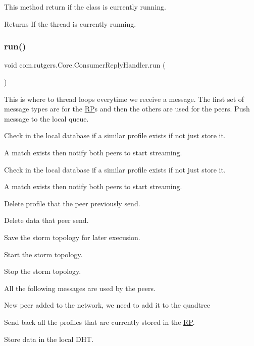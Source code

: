 This method return if the class is currently running. \begin{DoxyReturn}{Returns}
If the thread is currently running. 
\end{DoxyReturn}
\mbox{\label{classcom_1_1rutgers_1_1Core_1_1ConsumerReplyHandler_a975390fd28870020fe1ec8a98c539eca}} 
\subsubsection{\texorpdfstring{run()}{run()}}
{\footnotesize\ttfamily void com.\+rutgers.\+Core.\+Consumer\+Reply\+Handler.\+run (\begin{DoxyParamCaption}{ }\end{DoxyParamCaption})}

This is where to thread loops everytime we receive a message. The first set of message types are for the \hyperlink{classcom_1_1rutgers_1_1Core_1_1RP}{RP}\textquotesingle{}s and then the others are used for the peers. Push message to the local queue.

Check in the local database if a similar profile exists if not just store it.

A match exists then notify both peers to start streaming.

Check in the local database if a similar profile exists if not just store it.

A match exists then notify both peers to start streaming.

Delete profile that the peer previously send.

Delete data that peer send.

Save the storm topology for later execusion.

Start the storm topology.

Stop the storm topology.

All the following messages are used by the peers.

New peer added to the network, we need to add it to the quadtree

Send back all the profiles that are currently stored in the \hyperlink{classcom_1_1rutgers_1_1Core_1_1RP}{RP}.

Store data in the local D\+HT.


